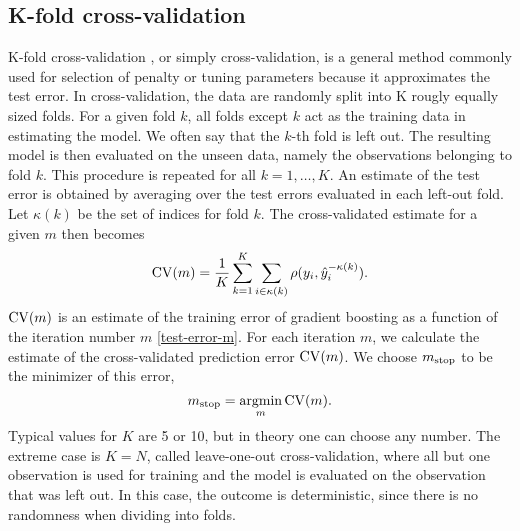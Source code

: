
\subsection{K-fold cross-validation}\label{subsec:K-fold}
K-fold cross-validation \citep{lachenbruch}, or simply cross-validation, is a general method commonly used for selection of penalty or tuning parameters because it approximates the test error.
In cross-validation, the data are randomly split into K rougly equally sized folds.
For a given fold $k$, all folds except $k$ act as the training data in estimating the model.
We often say that the $k$-th fold is left out.
The resulting model is then evaluated on the unseen data, namely the observations belonging to fold $k$.
This procedure is repeated for all $k=1,\ldots,K$.
An estimate of the test error is obtained by averaging over the test errors evaluated in each left-out fold.
Let $\kappa(k)$ be the set of indices for fold $k$.
The cross-validated estimate for a given $m$ then becomes
\begin{equation*}
    \operatorname{CV}(m)=\frac{1}{K}\sum_{k=1}^K\sum_{i\in\kappa(k)}\rho(y_i,\hat{y}_i^{-\kappa(k)}).
\end{equation*}
$\operatorname{CV}(m)$ is an estimate of the training error of gradient boosting as a function of the iteration number $m$ \eqref{test-error-m}.
For each iteration $m$, we calculate the estimate of the cross-validated prediction error $\operatorname{CV}(m)$.
We choose $m_{\text{stop}}$ to be the minimizer of this error,
\begin{equation*}
    m_{\text{stop}}=\operatorname*{argmin}_{m}\operatorname{CV}(m).
\end{equation*}
Typical values for $K$ are 5 or 10, but in theory one can choose any number. The extreme case is $K=N$, called leave-one-out cross-validation, where all but one observation is used for training and the model is evaluated on the observation that was left out. In this case, the outcome is deterministic, since there is no randomness when dividing into folds.

